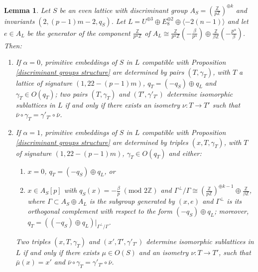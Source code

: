\documentclass{amsart}
\newtheorem{lemma}[theorem]{Lemma}
\theoremstyle{definition}
\newcommand{\ra}{\rightarrow}
\newcommand{\IZ}{\mathbb{Z}}
\begin{document}
\begin{lemma}\label{embeddings of S}
Let $S$ be an even lattice with discriminant group $A_S = \left( \frac{\IZ}{p \IZ}\right)^{\oplus k}$ and invariants $(2, (p-1)m - 2, q_S)$. Let $L=U^{\oplus 3} \oplus E_8^{\oplus 2} \oplus \langle -2(n-1) \rangle$ and let $e \in A_L$ be the generator of the component $\frac{\IZ}{p^\alpha\IZ}$ of $A_L \cong \frac{\IZ}{p^\alpha\IZ} \left( -\frac{\beta}{p^\alpha} \right) \oplus \frac{\IZ}{\beta \IZ} \left( -\frac{p^\alpha}{\beta} \right)$. Then:
\begin{enumerate}
\item[\textit{(i)}] If $\alpha = 0$, primitive embeddings of $S$ in $L$ compatible with Proposition \ref{discriminant groups structure} are determined by pairs $(T, \gamma_T)$, with $T$ a lattice of signature \mbox{$(1, 22 - (p-1)m)$}, $q_T = (-q_S)\oplus q_L$ and $\gamma_T \in O(q_T)$; two pairs $(T, \gamma_T)$ and $(T', \gamma'_{T'})$ determine isomorphic sublattices in $L$ if and only if there exists an isometry $\nu: T \ra T'$ such that $\bar{\nu} \circ \gamma_T = \gamma'_{T'} \circ \bar{\nu}$.
\item[\textit{(ii)}] If $\alpha = 1$, primitive embeddings of $S$ in $L$ compatible with Proposition \ref{discriminant groups structure} are determined by triples $(x, T, \gamma_T)$, with $T$ of signature \mbox{$(1, 22 - (p-1)m)$}, $\gamma_T \in O(q_T)$ and either:
\begin{enumerate}
\item $x = 0$, $q_T = (-q_S)\oplus q_L$, or
\item $x \in A_S[p]$ with $q_S(x)= -\frac{\beta}{p} \; (\text{mod } 2\IZ)$ and $\Gamma^\perp/\Gamma \cong \left( \frac{\IZ}{p \IZ}\right)^{\oplus k-1} \oplus \frac{\IZ}{\beta \IZ}$, where $\Gamma \subset A_S \oplus A_L$ is the subgroup generated by $(x,e)$ and $\Gamma^\perp$ is its orthogonal complement with respect to the form $(-q_S)\oplus q_L$; moreover, \mbox{$q_T = ((-q_S)\oplus q_L)\rvert_{\Gamma^\perp/\Gamma}$}.
\end{enumerate}
Two triples $(x, T, \gamma_T)$ and $(x', T', \gamma'_{T'})$ determine isomorphic sublattices in $L$ if and only if there exists $\mu \in O(S)$ and an isometry $\nu: T \ra T'$, such that $\bar{\mu}(x)=x'$ and $\bar{\nu} \circ\gamma_T = \gamma'_{T'} \circ \bar{\nu}$.
\end{enumerate}
\end{lemma}
\end{document}

